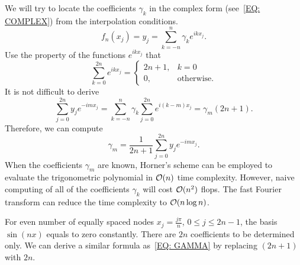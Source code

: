 We will try to locate the coefficients $\gamma_k$ in the complex form (see~\eqref{EQ: COMPLEX}) from the interpolation conditions.
\begin{equation}
    f_n(x_j) = y_j = \sum_{k=-n}^n \gamma_k e^{i k x_j}.
\end{equation}
Use the property of the functions $e^{ikx_j}$ that 
\begin{equation}
    \sum_{k=0}^{2n} e^{ik x_j} = \begin{cases}
        2n+1, & k = 0\\
        0, &\text{otherwise}.
    \end{cases}
\end{equation}
It is not difficult to derive 
\begin{equation}
    \sum_{j = 0}^{2n} y_j e^{-im x_j} = \sum_{k=-n}^{n} \gamma_k \sum_{j=0}^{2n} e^{i (k - m) x_j} = \gamma_{m} (2n+1).  
\end{equation}
Therefore, we can compute 
\begin{equation}\label{EQ: GAMMA}
    \gamma_m = \frac{1}{2n+1}  \sum_{j = 0}^{2n} y_j e^{-im x_j}.
\end{equation}
When the coefficients $\gamma_m$ are known, Horner's scheme can be employed to evaluate the trigonometric polynomial in $\mathcal O(n)$ time complexity.  However, naive computing of all of the coefficients $\gamma_k$ will cost $\mathcal O(n^2)$ flops. The fast Fourier transform can reduce the time complexity to $\mathcal O(n\log n)$.
\begin{remark}
    For even number of equally spaced nodes $x_j = \frac{j\pi}{n}$, $0\le j\le 2n-1$, the basis $\sin( n x)$ equals to zero constantly. There are $2n$ coefficients to be determined only. We can derive a similar formula as~\eqref{EQ: GAMMA} by replacing $(2n+1)$ with $2n$.
\end{remark}

